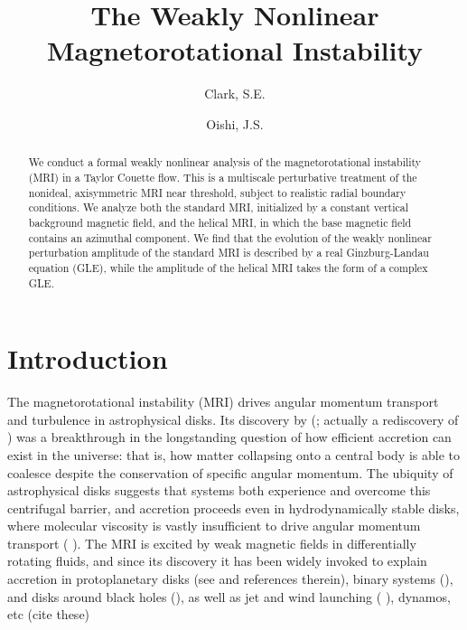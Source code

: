 \documentclass{emulateapj}
\newcommand{\citei}[1]{\citeauthor{#1} \citeyear{#1}}
\begin{document}
\title{The Weakly Nonlinear Magnetorotational Instability} %
\author{Clark, S.E.}
\author{Oishi, J.S. }


\begin{abstract}
We conduct a formal weakly nonlinear analysis of the magnetorotational instability (MRI) in a Taylor Couette flow. This is a multiscale perturbative treatment of the nonideal, axisymmetric MRI near threshold, subject to realistic radial boundary conditions. We analyze both the standard MRI, initialized by a constant vertical background magnetic field, and the helical MRI, in which the base magnetic field contains an azimuthal component. We find that the evolution of the weakly nonlinear perturbation amplitude of the standard MRI is described by a real Ginzburg-Landau equation (GLE), while the amplitude of the helical MRI takes the form of a complex GLE.   
\end{abstract}

\section{Introduction}

The magnetorotational instability (MRI) drives angular momentum transport and turbulence in astrophysical disks. Its discovery by \citeauthor{Balbus:1991vs} (\citeyear{Balbus:1991vs}; actually a rediscovery of \citei{Chandrasekhar:1960wh}) was a breakthrough in the longstanding question of how efficient accretion can exist in the universe: that is, how matter collapsing onto a central body is able to coalesce despite the conservation of specific angular momentum. %
The ubiquity of astrophysical disks suggests that systems both experience and overcome this centrifugal barrier, and accretion proceeds even in hydrodynamically stable disks, where molecular viscosity is vastly insufficient to drive angular momentum transport (\citei{Shakura:1973wg}). The MRI is excited by weak magnetic fields in differentially rotating fluids, and since its discovery it has been widely invoked to explain accretion in protoplanetary disks (see \citei{Armitage:2010} and references therein), binary systems (), and disks around black holes (), as well as jet and wind launching (\citei{Lesur:2013}), dynamos, etc (cite these)
\end{document}
